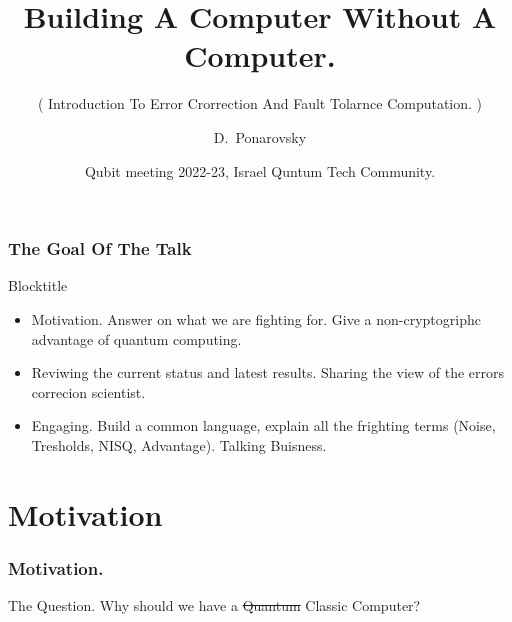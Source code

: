\documentclass[usenames,dvipsnames]{beamer}
\title[Building A Computer Without A Computer] %
{Building A Computer Without A Computer.}
\subtitle{ ( Introduction To Error Crorrection And Fault Tolarnce Computation. ) }
\author[D.~Ponarovsky] %
	{D.~Ponarovsky\inst{1}}
\institute[HUJI] %
	{ \inst{1} Faculty of Computer Science\newline
	  Hebrew University of Jerusalem
	}
\date[2022-23] %
{Qubit meeting 2022-23, Israel Quntum Tech Community.}
\begin{document}

     \begin{frame}
     \maketitle
   \end{frame}

   \begin{frame}
     \frametitle{ The Goal Of The Talk  }

   \begin{exampleblock}{ Blocktitle } 
     \begin{itemize}
       \item<1-> Motivation. Answer on what we are fighting for. Give a non-cryptogriphc advantage of quantum computing.  
       \item<2-> Reviwing the current status and latest results. Sharing the view of the errors correcion scientist.    
       \item<3-> Engaging. Build a common language, explain all the frighting terms (Noise, Tresholds, NISQ, Advantage). Talking Buisness. 
    \end{itemize}
  \end{exampleblock}
   \end{frame}
	\section{Motivation}
	\begin{frame}[t]
	\frametitle{Motivation.}
	 
	\begin{exampleblock}{The Question.}
	    Why should we have a  \uncover<2-> {\sout{Quantum} Classic} Computer?
	  \end{exampleblock}

	  
	   {
	    \vspace*{-3cm} \hspace*{6cm}  
	  }
	  
	   {
	    \vspace*{-3cm} \hspace*{2cm}  
	  }
     
	\end{frame}
\end{document}
